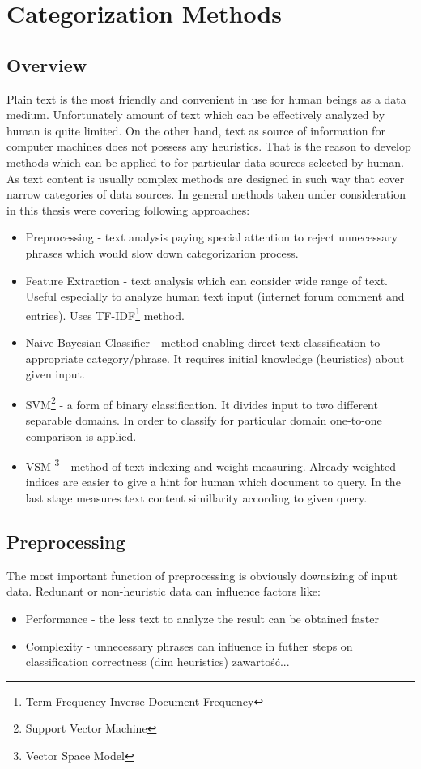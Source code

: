 \chapter{Categorization Methods}
\section{Overview}
Plain text is the most friendly and convenient in use for human beings as a data medium. Unfortunately amount of text which can be effectively analyzed by human is quite limited. On the other hand, text as source of information for computer machines does not possess any heuristics. That is the reason to develop methods which can be applied to for particular data sources selected by human. As text content is usually complex methods are designed in such way that cover narrow categories of data sources. In general methods taken under consideration in this thesis were covering following approaches:
\begin{itemize}
	\item Preprocessing - text analysis paying special attention to reject unnecessary phrases which would slow down categorizarion process.
	\item Feature Extraction - text analysis which can consider wide range of text. Useful especially to analyze human text input (internet forum comment and entries). Uses TF-IDF\footnote{Term Frequency-Inverse Document Frequency} method.
	\item Naive Bayesian Classifier - method enabling direct text classification to appropriate category/phrase. It requires initial knowledge (heuristics) about given input.
	\item SVM\footnote{Support Vector Machine} - a form of binary classification. It divides input to two different separable domains. In order to classify for particular domain one-to-one comparison is applied.
	\item VSM \footnote{Vector Space Model} - method of text indexing and weight measuring. Already weighted indices are easier to give a hint for human which document to query. In the last stage measures text content simillarity according to given query.
	       
\end{itemize}

\section{Preprocessing}
The most important function of preprocessing is obviously downsizing of input data. Redunant or non-heuristic data can influence factors like:
\begin{itemize}
	\item Performance - the less text to analyze the result can be obtained faster
	\item Complexity - unnecessary phrases can influence in futher steps on classification correctness (dim heuristics)
	zawartość...
\end{itemize}


